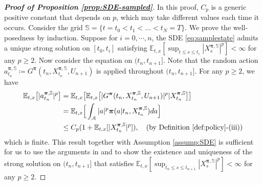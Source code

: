 \documentclass[11pt]{article}
\newcommand{\1}{\mathbbm{1}}
\newcommand{\bpi}{\boldsymbol{\pi}}
\begin{document}
\begin{proof}[\bf Proof of Proposition \ref{prop:SDE-sampled}]
	In this proof, $C_p$ is a generic positive constant that depends on $p$, which may take different values each time it occurs.
	Consider the grid $\mathbb{S}= \{t = t_0 < t_1 < \ldots < t_N = T\}$. We prove the well-posedness by induction. Suppose for $i=0,\cdots,n$, the SDE \eqref{eq:samplestate} admits a unique strong solution on $[t_0,t_i]$ satisfying $\mathbb{E}_{t,x}[\sup_{t \le s\le t_i}|X_s^{\bpi, \mathbb{S}}|^p]<\infty$ for any $p\geq 2$. Now consider the equation on $(t_n,t_{n+1}]$. Note that the random action $a_{t_n}^{\bpi,\mathbb{S}}\coloneqq G^{\bpi}(t_n, X^{\bpi, \mathbb{S}}_{t_n}, U_{n+1})$ is applied throughout $(t_n,t_{n+1}]$. For any $p\geq 2$, we have
	\begin{align}
		\mathbb{E}_{t,x}\big[|a_{t_n}^{\bpi,\mathbb{S}}|^p\big] &= \mathbb{E}_{t,x}\big[\mathbb{E}_{t,x}\big[|G^{\bpi}(t_n, X^{\bpi, \mathbb{S}}_{t_n}, U_{n+1})|^p|X^{\bpi, \mathbb{S}}_{t_n}\big]\big]\\
		&=\mathbb{E}_{t,x}\Big[\int_{\mathcal{A}}|a|^p\bpi(a | t_n, X^{\bpi, \mathbb{S}}_{t_n})da\Big]\\
		&\leq C_p(1+\mathbb{E}_{t,x}[|X^{\bpi, \mathbb{S}}_{t_n}|^p]), \quad (\text{by Definition \ref{def:policy}-(iii)})
		\label{eq:action-moment-grid}
	\end{align}
	which is finite. This result together with Assumption \ref{assump:SDE} is sufficient for us to use the arguments in \cite{kunita2004stochastic} and \cite{rong2006theory} to show the existence and uniqueness of the strong solution on $(t_n,t_{n+1}]$ that satisfies $\mathbb{E}_{t,x}[\sup_{t_{n}\le s\le t_{n+1}}|X_s^{\bpi, \mathbb{S}}|^p]<\infty$ for any $p\geq 2$.
	

\end{proof}
\end{document}
